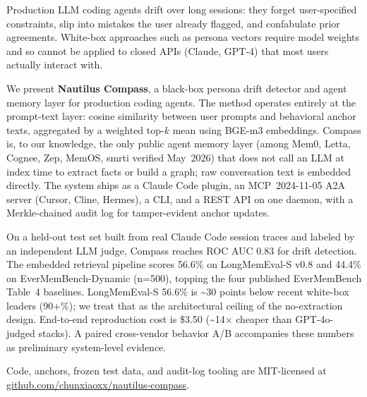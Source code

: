 
Production LLM coding agents drift over long sessions: they forget
user-specified constraints, slip into mistakes the user already
flagged, and confabulate prior agreements. White-box approaches such
as persona vectors require model weights and so cannot be applied to
closed APIs (Claude, GPT-4) that most users actually interact with.

We present \textbf{Nautilus Compass}, a black-box persona drift
detector and agent memory layer for production coding agents. The
method operates entirely at the prompt-text layer: cosine similarity
between user prompts and behavioral anchor texts, aggregated by a weighted top-$k$ mean using
BGE-m3 embeddings. Compass is, to our knowledge, the only public
agent memory layer (among Mem0, Letta, Cognee, Zep, MemOS, smrti
verified May~2026) that does not call an LLM at index time to extract
facts or build a graph; raw conversation text is embedded directly.
The system ships as a Claude Code plugin, an MCP~2024-11-05 A2A server
(Cursor, Cline, Hermes), a CLI, and a REST API on one daemon, with a
Merkle-chained audit log for tamper-evident anchor updates.

On a held-out test set built from real Claude Code session traces and
labeled by an independent LLM judge, Compass reaches ROC AUC 0.83 for
drift detection. The embedded retrieval pipeline scores 56.6\% on
LongMemEval-S v0.8 and 44.4\% on EverMemBench-Dynamic (n=500), topping
the four published EverMemBench Table~4 baselines. LongMemEval-S 56.6\% is \textasciitilde 30 points below recent
white-box leaders (90+\%); we treat that as the architectural ceiling
of the no-extraction design. End-to-end reproduction cost is \$3.50
(\textasciitilde 14$\times$ cheaper than GPT-4o-judged stacks). A paired cross-vendor behavior A/B
accompanies these numbers as preliminary system-level evidence.

Code, anchors, frozen test data, and audit-log tooling are
MIT-licensed at \url{github.com/chunxiaoxx/nautilus-compass}.
